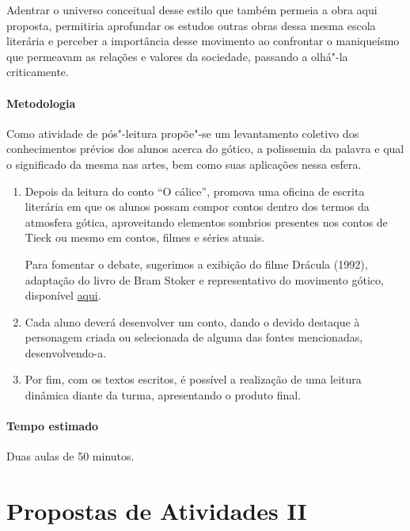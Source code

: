 \documentclass[12pt]{extarticle}
\begin{document}
Adentrar o universo conceitual desse estilo que também permeia a obra aqui proposta, 
permitiria aprofundar os estudos outras obras dessa mesma escola literária e perceber 
a importância desse movimento ao confrontar o maniqueísmo que permeavam as relações e 
valores da sociedade, passando a olhá"-la criticamente.

\paragraph{Metodologia}
Como atividade de pós"-leitura propõe"-se um levantamento coletivo dos
conhecimentos prévios dos alunos acerca do gótico, a polissemia da palavra e qual o
significado da mesma nas artes, bem como suas aplicações nessa esfera.

\begin{enumerate}


\item 
Depois da leitura do conto ``O cálice'', promova uma oficina de escrita literária
em que os alunos possam compor contos dentro dos termos da atmosfera gótica, aproveitando
elementos sombrios presentes nos contos de Tieck ou mesmo em contos,
filmes e séries atuais.

Para fomentar o debate, sugerimos a exibição do filme Drácula (1992), adaptação do livro 
de Bram Stoker e representativo do movimento gótico, disponível \href{https://www.youtube.com/watch?v=WmRtEHi7Op0&ab_channel=CineAntiquaRed}{aqui}.

\item 
Cada aluno deverá desenvolver um conto, dando o devido destaque à
personagem criada ou selecionada de alguma das fontes mencionadas,
desenvolvendo-a. 

\item 
Por fim, com os textos escritos, é
possível a realização de uma leitura dinâmica diante da turma,
apresentando o produto final.

\end{enumerate}

\paragraph{Tempo estimado} Duas aulas de 50 minutos. 


\section{Propostas de Atividades II}
\end{document}
